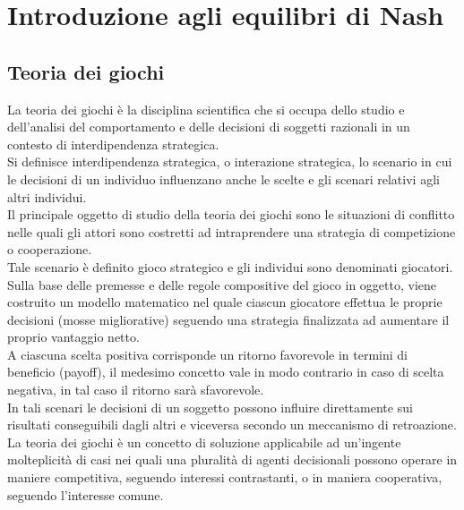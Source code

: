 \chapter{Introduzione agli equilibri di Nash}

\section{Teoria dei giochi}
\justify
La teoria dei giochi è la disciplina scientifica che si occupa dello studio e dell'analisi del comportamento e delle decisioni di soggetti razionali in un contesto di interdipendenza strategica.\\
Si definisce interdipendenza strategica, o interazione strategica, lo scenario in cui le decisioni di un individuo influenzano anche le scelte e gli scenari relativi agli altri individui.\\
Il principale oggetto di studio della teoria dei giochi sono le situazioni di conflitto nelle quali gli attori sono costretti ad intraprendere una strategia di competizione o cooperazione.\\
Tale scenario è definito gioco strategico e gli individui sono denominati giocatori.\\
Sulla base delle premesse e delle regole compositive del gioco in oggetto, viene costruito un modello matematico nel quale ciascun giocatore effettua le proprie decisioni (mosse migliorative) seguendo una strategia finalizzata ad aumentare il proprio vantaggio netto.\\
A ciascuna scelta positiva corrisponde un ritorno favorevole in termini di beneficio (payoff), il medesimo concetto vale in modo contrario in caso di scelta negativa, in tal caso il ritorno sarà sfavorevole.\\
In tali scenari le decisioni di un soggetto possono influire direttamente sui risultati conseguibili dagli altri e viceversa secondo un meccanismo di retroazione.\\
La teoria dei giochi è un concetto di soluzione applicabile ad un'ingente molteplicità di casi nei quali una pluralità di agenti decisionali possono operare in maniere competitiva, seguendo interessi contrastanti, o in maniera  cooperativa, seguendo l'interesse comune.\newline

